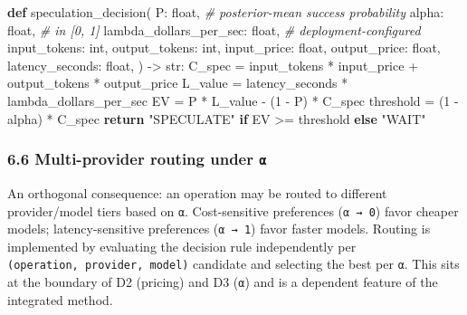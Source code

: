 \documentclass[
  11pt,
]{article}
\newenvironment{Shaded}{}{}
\newcommand{\BuiltInTok}[1]{\textcolor[rgb]{0.00,0.50,0.00}{#1}}
\newcommand{\CommentTok}[1]{\textcolor[rgb]{0.38,0.63,0.69}{\textit{#1}}}
\newcommand{\ControlFlowTok}[1]{\textcolor[rgb]{0.00,0.44,0.13}{\textbf{#1}}}
\newcommand{\DecValTok}[1]{\textcolor[rgb]{0.25,0.63,0.44}{#1}}
\newcommand{\KeywordTok}[1]{\textcolor[rgb]{0.00,0.44,0.13}{\textbf{#1}}}
\newcommand{\NormalTok}[1]{#1}
\newcommand{\OperatorTok}[1]{\textcolor[rgb]{0.40,0.40,0.40}{#1}}
\newcommand{\StringTok}[1]{\textcolor[rgb]{0.25,0.44,0.63}{#1}}
\begin{document}
\begin{Shaded}
\begin{Highlighting}[]
\KeywordTok{def}\NormalTok{ speculation\_decision(}
\NormalTok{    P: }\BuiltInTok{float}\NormalTok{,                       }\CommentTok{\# posterior{-}mean success probability}
\NormalTok{    alpha: }\BuiltInTok{float}\NormalTok{,                   }\CommentTok{\# in [0, 1]}
\NormalTok{    lambda\_dollars\_per\_sec: }\BuiltInTok{float}\NormalTok{,  }\CommentTok{\# deployment{-}configured}
\NormalTok{    input\_tokens: }\BuiltInTok{int}\NormalTok{, output\_tokens: }\BuiltInTok{int}\NormalTok{,}
\NormalTok{    input\_price: }\BuiltInTok{float}\NormalTok{, output\_price: }\BuiltInTok{float}\NormalTok{,}
\NormalTok{    latency\_seconds: }\BuiltInTok{float}\NormalTok{,}
\NormalTok{) }\OperatorTok{{-}\textgreater{}} \BuiltInTok{str}\NormalTok{:}
\NormalTok{    C\_spec    }\OperatorTok{=}\NormalTok{ input\_tokens }\OperatorTok{*}\NormalTok{ input\_price }\OperatorTok{+}\NormalTok{ output\_tokens }\OperatorTok{*}\NormalTok{ output\_price}
\NormalTok{    L\_value   }\OperatorTok{=}\NormalTok{ latency\_seconds }\OperatorTok{*}\NormalTok{ lambda\_dollars\_per\_sec}
\NormalTok{    EV        }\OperatorTok{=}\NormalTok{ P }\OperatorTok{*}\NormalTok{ L\_value }\OperatorTok{{-}}\NormalTok{ (}\DecValTok{1} \OperatorTok{{-}}\NormalTok{ P) }\OperatorTok{*}\NormalTok{ C\_spec}
\NormalTok{    threshold }\OperatorTok{=}\NormalTok{ (}\DecValTok{1} \OperatorTok{{-}}\NormalTok{ alpha) }\OperatorTok{*}\NormalTok{ C\_spec}
    \ControlFlowTok{return} \StringTok{"SPECULATE"} \ControlFlowTok{if}\NormalTok{ EV }\OperatorTok{\textgreater{}=}\NormalTok{ threshold }\ControlFlowTok{else} \StringTok{"WAIT"}
\end{Highlighting}
\end{Shaded}

\subsubsection{\texorpdfstring{6.6 Multi-provider routing under
\texttt{α}}{6.6 Multi-provider routing under α}}\label{multi-provider-routing-under-ux3b1}

An orthogonal consequence: an operation may be routed to different
provider/model tiers based on \texttt{α}. Cost-sensitive preferences
(\texttt{α\ →\ 0}) favor cheaper models; latency-sensitive preferences
(\texttt{α\ →\ 1}) favor faster models. Routing is implemented by
evaluating the decision rule independently per
\texttt{(operation,\ provider,\ model)} candidate and selecting the best
per \texttt{α}. This sits at the boundary of D2 (pricing) and D3
(\texttt{α}) and is a dependent feature of the integrated method.
\end{document}

